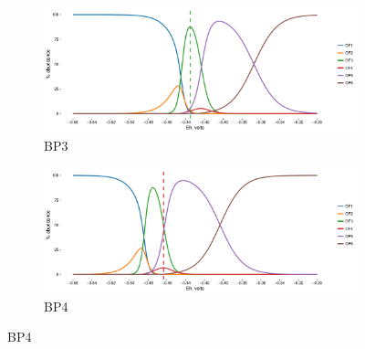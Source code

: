 \begin{figure}[h]\ContinuedFloat
\centering

    \begin{subfigure}[b]{\linewidth}
      	\includegraphics[width=1\linewidth]{"figs_ch2/Bison OF3_thermo"}
      	\caption{BP3}
        \label{fig:BP3_thermo}
    \end{subfigure}
    \begin{subfigure}[b]{\linewidth}
    	\includegraphics[width=1\linewidth]{"figs_ch2/Bison OF4_thermo"}
    	\caption{BP4}
        \label{fig:BP4_thermo}
    \end{subfigure}
    
\end{figure}

\newpage

